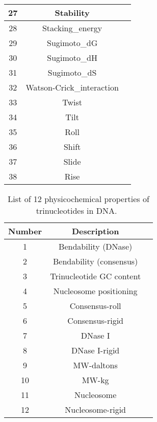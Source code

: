 \begin{footnotesize}
\begin{longtable}{ccc}
        27 & Stability	\\\midrule
        28 & Stacking\_energy	\\\midrule
        29 & Sugimoto\_dG	\\\midrule
        30 & Sugimoto\_dH	\\\midrule
        31 & Sugimoto\_dS	\\\midrule
        32 & Watson-Crick\_interaction	\\\midrule
        33 & Twist	\\\midrule
        34 & Tilt	\\\midrule
        35 & Roll	\\\midrule
        36 & Shift	\\\midrule
        37 & Slide	\\\midrule
        38 & Rise	\\
        
        \bottomrule
        
    \end{longtable}
\end{footnotesize}
    
\begin{footnotesize}
    \begin{longtable}{ccc}
        \caption{List of 12 physicochemical properties of trinucleotides in DNA.~\cite{Chen2014PseKNC:Composition}}
        \label{tab:12_tri}
        \endfirsthead
        \endhead
        \toprule
        \textbf{Number} & \textbf{Description}\\\midrule
        
        1	& Bendability (DNase)	\\\midrule
        2	& Bendability (consensus)	\\\midrule
        3	& Trinucleotide GC content	\\\midrule
        4	& Nucleosome positioning	\\\midrule
        5	& Consensus-roll \\\midrule
        6	& Consensus-rigid \\\midrule
        7	& DNase I	\\\midrule
        8	& DNase I-rigid	\\\midrule
        9	& MW-daltons	\\\midrule
        10	& MW-kg \\\midrule
        11	& Nucleosome	\\\midrule
        12	& Nucleosome-rigid	\\
        
        \bottomrule
        
    \end{longtable}
\end{footnotesize}

